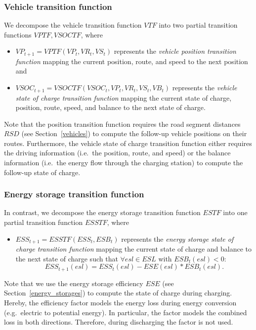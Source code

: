 \subsubsection{Vehicle transition function}
\label{transitions_vehicles}

We decompose the vehicle transition function $VTF$ into two partial transition functions $VPTF,VSOCTF$, where
\begin{itemize}
	\item $VP_{t+1} = VPTF(VP_t, VR_t, VS_t)$ represents the \textit{vehicle position transition function} mapping the current position, route, and speed to the next position and
	\item $VSOC_{t+1} = VSOCTF(VSOC_t, VP_t, VR_t, VS_t, VB_t)$ represents the \textit{vehicle state of charge transition function} mapping the current state of charge, position, route, speed, and balance to the next state of charge.
\end{itemize}
Note that the position transition function requires the road segment distances $RSD$ (see Section~\ref{vehicles}) to compute the follow-up vehicle positions on their routes. Furthermore, the vehicle state of charge transition function either requires the driving information (i.e.\ the position, route, and speed) or the balance information (i.e.\ the energy flow through the charging station) to compute the follow-up state of charge.

\subsubsection{Energy storage transition function}
\label{transitions_storages}

In contrast, we decompose the energy storage transition function $ESTF$ into one partial transition function $ESSTF$, where
\begin{itemize}
	\item $ESS_{t+1} = ESSTF(ESS_t, ESB_t)$ represents the \textit{energy storage state of charge transition function} mapping the current state of charge and balance to the next state of charge such that $\forall esl \in ESL$ with $ESB_t(esl) < 0:$
	\[
		ESS_{t+1}(esl) = ESS_t(esl) - ESE(esl) * ESB_t(esl) \textrm{.}
	\]
\end{itemize}
Note that we use the energy storage efficiency $ESE$ (see Section~\ref{energy_storages}) to compute the state of charge during charging. Hereby, the efficiency factor models the energy loss during energy conversion (e.g.\ electric to potential energy). In particular, the factor models the combined loss in both directions. Therefore, during discharging the factor is not used.

